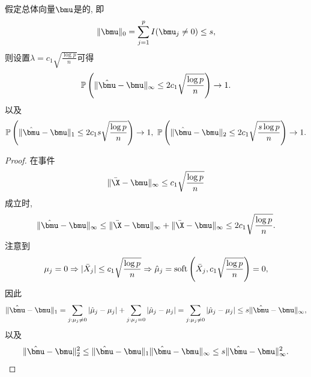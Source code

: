 \begin{prop}[严格稀疏均值估计]
    假定总体向量$\bmu$是的, 即
    \begin{align*}
        \|\bmu\|_0 =\sum_{j=1}^p I(\bmu_j \neq 0) \leq s,
    \end{align*}	
    则设置$\lambda=c_1 \sqrt{\frac{\log p}{n}}$可得
    \begin{align*}
        \Pr\left(\|\hat{\bmu}-\bmu\|_\infty\leq 2c_1\sqrt{\frac{\log p}{n}}\right) \to 1.
    \end{align*}
    以及
    \begin{align*}
        \Pr\left(\|\hat{\bmu}-\bmu\|_1 \leq 2c_1 s\sqrt{\frac{\log p}{n}}\right) \to 1,~\Pr\left(\|\hat{\bmu}-\bmu\|_2 \leq 2c_1\sqrt{\frac{s\log p}{n}}\right) \to 1.
    \end{align*}
    \end{prop}
\begin{proof}
在事件
\begin{align*}
	\|\bar{\X}-\bmu\|_\infty \leq  c_1 \sqrt{\frac{\log p}{n}}
\end{align*}	
成立时,
\begin{align*}
	\|\hat{\bmu}-\bmu\|_\infty \leq \|\bar{\X}-\bmu\|_\infty+\|\bar{\X}-\bmu\|_\infty \leq 2c_1 \sqrt{\frac{\log p}{n}}.
\end{align*}
注意到
\begin{align*}
	\mu_j=0 \Rightarrow |\bar{X}_j|\leq c_1 \sqrt{\frac{\log p}{n}} \Rightarrow \hat{\mu}_j=\mbox{soft}\left(\bar{X}_j, c_1 \sqrt{\frac{\log p}{n}}\right)=0,
\end{align*}
因此
\begin{align*}
	\|\hat{\bmu}-\bmu\|_1=\sum_{j: \mu_j \neq 0} |\hat{\mu}_j-\mu_j|+\sum_{j: \mu_j = 0} |\hat{\mu}_j-\mu_j|=\sum_{j: \mu_j \neq 0} |\hat{\mu}_j-\mu_j| \leq s \|\hat{\bmu}-\bmu\|_\infty,
\end{align*}
以及
\begin{align*}
	\|\hat{\bmu}-\bmu\|^2_2 \leq \|\hat{\bmu}-\bmu\|_1 \|\hat{\bmu}-\bmu\|_\infty \leq s \|\hat{\bmu}-\bmu\|^2_\infty.
\end{align*}
\end{proof}



